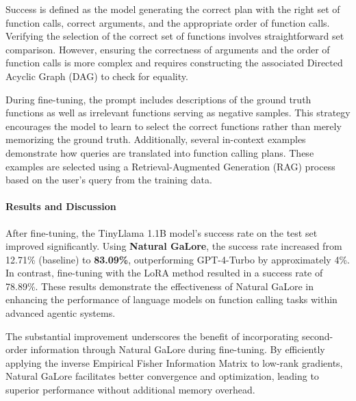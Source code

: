 Success is defined as the model generating the correct plan with the right set of function calls, correct arguments, and the appropriate order of function calls. Verifying the selection of the correct set of functions involves straightforward set comparison. However, ensuring the correctness of arguments and the order of function calls is more complex and requires constructing the associated Directed Acyclic Graph (DAG) to check for equality.

During fine-tuning, the prompt includes descriptions of the ground truth functions as well as irrelevant functions serving as negative samples. This strategy encourages the model to learn to select the correct functions rather than merely memorizing the ground truth. Additionally, several in-context examples demonstrate how queries are translated into function calling plans. These examples are selected using a Retrieval-Augmented Generation (RAG) process based on the user's query from the training data.

\paragraph{Results and Discussion}

After fine-tuning, the TinyLlama 1.1B model's success rate on the test set improved significantly. Using \textbf{Natural GaLore}, the success rate increased from 12.71\% (baseline) to \textbf{83.09\%}, outperforming GPT-4-Turbo by approximately 4\%. In contrast, fine-tuning with the LoRA method resulted in a success rate of 78.89\%. These results demonstrate the effectiveness of Natural GaLore in enhancing the performance of language models on function calling tasks within advanced agentic systems.

The substantial improvement underscores the benefit of incorporating second-order information through Natural GaLore during fine-tuning. By efficiently applying the inverse Empirical Fisher Information Matrix to low-rank gradients, Natural GaLore facilitates better convergence and optimization, leading to superior performance without additional memory overhead.

